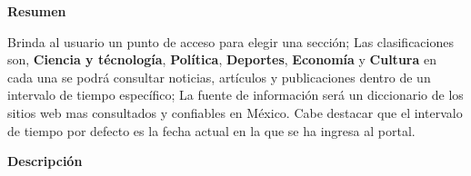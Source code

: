 
\begin{large}
	\textbf{Resumen}\\
\end{large}

Brinda al usuario un punto de acceso para elegir una sección; Las clasificaciones son, 
\textbf{Ciencia y técnología}, \textbf{Política}, \textbf{Deportes}, \textbf{Economía} y  
\textbf{Cultura} en cada una se podrá consultar noticias, artículos y publicaciones dentro 
de un intervalo de tiempo específico; La fuente de información será un diccionario de los sitios
 web mas consultados y confiables en México. Cabe destacar que el intervalo de tiempo por defecto 
 es la fecha actual en la que se ha ingresa al portal.\\

\begin{large}
	\textbf{Descripción}\\
\end{large}


